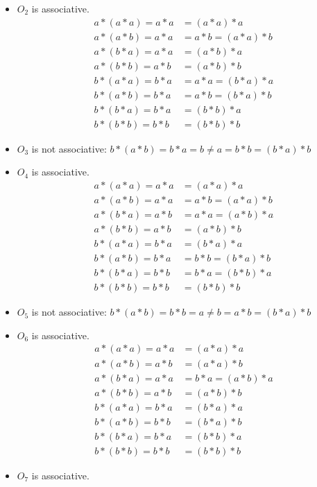 \begin{enumerate}[label={\Alph*.},font={\bfseries}]
\begin{enumerate}[label={\arabic*},font={\bfseries}]
\begin{itemize}
    \item $O_2$ is associative.
      \begin{align*}
        a*(a*a) = a*a &= (a*a)*a \\
        a*(a*b) = a*a &= a*b = (a*a)*b \\
        a*(b*a) = a*a &= (a*b)*a \\
        a*(b*b) = a*b &= (a*b)*b \\
        b*(a*a) = b*a &= a*a = (b*a)*a \\
        b*(a*b) = b*a &= a*b = (b*a)*b \\
        b*(b*a) = b*a &= (b*b)*a \\
        b*(b*b) = b*b &= (b*b)*b
      \end{align*}
    \item $O_3$ is not associative: $b*(a*b)=b*a=b \neq a=b*b=(b*a)*b$
    \item $O_4$ is associative.
      \begin{align*}
        a*(a*a) = a*a &= (a*a)*a \\
        a*(a*b) = a*a &= a*b = (a*a)*b \\
        a*(b*a) = a*b &= a*a = (a*b)*a \\
        a*(b*b) = a*b &= (a*b)*b \\
        b*(a*a) = b*a &= (b*a)*a \\
        b*(a*b) = b*a &= b*b = (b*a)*b \\
        b*(b*a) = b*b &= b*a = (b*b)*a \\
        b*(b*b) = b*b &= (b*b)*b
      \end{align*}
    \item $O_5$ is not associative: $b*(a*b)=b*b=a \neq b=a*b=(b*a)*b$
    \item $O_6$ is associative.
      \begin{align*}
        a*(a*a) = a*a &= (a*a)*a\\
        a*(a*b) = a*b &= (a*a)*b\\
        a*(b*a) = a*a &= b*a = (a*b)*a \\
        a*(b*b) = a*b &= (a*b)*b \\
        b*(a*a) = b*a &= (b*a)*a \\
        b*(a*b) = b*b &= (b*a)*b \\
        b*(b*a) = b*a &= (b*b)*a \\
        b*(b*b) = b*b &= (b*b)*b
      \end{align*}
    \item $O_7$ is associative.

\end{itemize}
\end{enumerate}
\end{enumerate}
